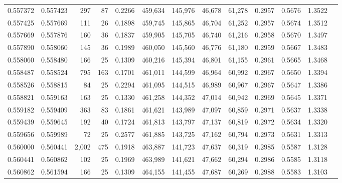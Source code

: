 \begin{tabular}{rrrrrrrrrrrrr}
0.557372 & 0.557423 &   297 &  87 &                                     0.2266 & 459,634 & 145,976 &  46,678 &  61,278 & 0.2957 & 0.5676 & 1.3522 \\
0.557425 & 0.557669 &   111 &  26 &                                     0.1898 & 459,745 & 145,865 &  46,704 &  61,252 & 0.2957 & 0.5674 & 1.3512 \\
0.557669 & 0.557876 &   160 &  36 &                                     0.1837 & 459,905 & 145,705 &  46,740 &  61,216 & 0.2958 & 0.5670 & 1.3497 \\
0.557890 & 0.558060 &   145 &  36 &                                     0.1989 & 460,050 & 145,560 &  46,776 &  61,180 & 0.2959 & 0.5667 & 1.3483 \\
0.558060 & 0.558480 &   166 &  25 &                                     0.1309 & 460,216 & 145,394 &  46,801 &  61,155 & 0.2961 & 0.5665 & 1.3468 \\
0.558487 & 0.558524 &   795 & 163 &                                     0.1701 & 461,011 & 144,599 &  46,964 &  60,992 & 0.2967 & 0.5650 & 1.3394 \\
0.558526 & 0.558815 &    84 &  25 &                                     0.2294 & 461,095 & 144,515 &  46,989 &  60,967 & 0.2967 & 0.5647 & 1.3386 \\
0.558821 & 0.559163 &   163 &  25 &                                     0.1330 & 461,258 & 144,352 &  47,014 &  60,942 & 0.2969 & 0.5645 & 1.3371 \\
0.559182 & 0.559409 &   363 &  83 &                                     0.1861 & 461,621 & 143,989 &  47,097 &  60,859 & 0.2971 & 0.5637 & 1.3338 \\
0.559439 & 0.559645 &   192 &  40 &                                     0.1724 & 461,813 & 143,797 &  47,137 &  60,819 & 0.2972 & 0.5634 & 1.3320 \\
0.559656 & 0.559989 &    72 &  25 &                                     0.2577 & 461,885 & 143,725 &  47,162 &  60,794 & 0.2973 & 0.5631 & 1.3313 \\
0.560000 & 0.560441 & 2,002 & 475 &                                     0.1918 & 463,887 & 141,723 &  47,637 &  60,319 & 0.2985 & 0.5587 & 1.3128 \\
0.560441 & 0.560862 &   102 &  25 &                                     0.1969 & 463,989 & 141,621 &  47,662 &  60,294 & 0.2986 & 0.5585 & 1.3118 \\
0.560862 & 0.561594 &   166 &  25 &                                     0.1309 & 464,155 & 141,455 &  47,687 &  60,269 & 0.2988 & 0.5583 & 1.3103 \\

\end{tabular}
